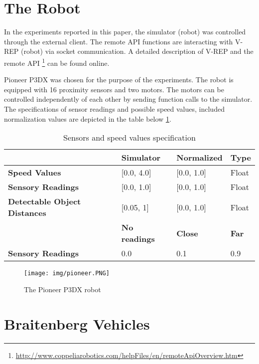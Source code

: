 \documentclass[format=acmsmall, review=false, screen=true]{acmart}
\begin{document}
\section{The Robot}

In the experiments reported in this paper, the simulator (robot) was controlled through the external client. The remote API functions are interacting with V-REP (robot) via socket communication. A detailed description of V-REP and the remote API \footnote{\url{http://www.coppeliarobotics.com/helpFiles/en/remoteApiOverview.htm}} can be found online.

Pioneer P3DX was chosen for the purpose of the experiments. The robot is equipped with 16 proximity sensors and two motors. The motors can be controlled independently of each other by sending function calls to the simulator. The specifications of sensor readings and possible speed values, included normalization values are depicted in the table below \ref{fig:specs}.

\begin{table}[H]
\begin{tabular}{llll}
\hline
\textbf{}                            & \textbf{Simulator}   & \textbf{Normalized} & \textbf{Type} \\ \hline
\textbf{Speed Values}                & {[}0.0, 4.0{]}       & {[}0.0, 1.0{]}      & Float         \\
\textbf{Sensory Readings}            & {[}0.0, 1.0{]}       & {[}0.0, 1.0{]}      & Float         \\
\textbf{Detectable Object Distances} & {[}0.05, 1{]}        & {[}0.0, 1.0{]}      & Float         \\
\textbf{}                            & \textbf{No readings} & \textbf{Close}      & \textbf{Far}  \\
\textbf{Sensory Readings}            & 0.0                  & 0.1                 & 0.9          
\end{tabular}
\caption{Sensors and speed values specification}
\label{fig:specs}
\end{table}

\begin{figure}[H]
  \texttt{[image: img/pioneer.PNG]}
  \caption{The Pioneer P3DX robot}
  \label{fig:pioneer-robot}
\end{figure}

\section{Braitenberg Vehicles}
\end{document}
